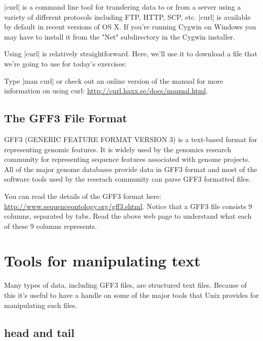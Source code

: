 \documentclass[10pt,letterpaper]{article}
\begin{document}
|curl| is a command line tool for transfering data to or from a server using a variety of different protocols including FTP, HTTP, SCP, etc.  |curl| is available by default in recent versions of OS X. If you're running Cygwin on Windows you may have to install it from the "Net" subdirectory in the Cygwin installer.

Using |curl| is relatively straightforward. Here, we'll use it to download a file that we're going to use for today's exercises:


Type |man curl| or check out an online version of the manual for more information on using curl: \url{http://curl.haxx.se/docs/manual.html}.



\subsection*{The GFF3 File Format}

GFF3 (GENERIC FEATURE FORMAT VERSION 3) is a text-based format for representing genomic features. It is widely used by the genomics research community for representing sequence features associated with genome projects. All of the major genome databases provide data in GFF3 format and most of the software tools used by the reserach community can parse GFF3 formatted files.

You can read the details of the GFF3 format here: \url{http://www.sequenceontology.org/gff3.shtml}. Notice that a GFF3 file consists 9 columns, separated by tabs. Read the above web page to understand what each of these 9 columns represents.

\section*{Tools for manipulating text}

Many types of data, including GFF3 files,  are structured text files. Because of this it's useful to have a handle on some of the  major tools that Unix provides for manipulating such files.


\subsection*{head and tail}
\end{document}
